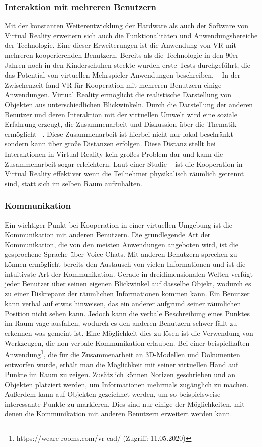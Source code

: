 \subsubsection{Interaktion mit mehreren Benutzern}
Mit der konstanten Weiterentwicklung der Hardware als auch der Software von Virtual Reality erweitern sich auch die Funktionalitäten und Anwendungsbereiche der Technologie. Eine dieser Erweiterungen ist die Anwendung von VR mit mehreren kooperierenden Benutzern. Bereits als die Technologie in den 90er Jahren noch in den Kinderschuhen steckte wurden erste Tests durchgeführt, die das Potential von virtuellen Mehrspieler-Anwendungen beschreiben. ~\parencite{youngblut1998educational}\newline
In der Zwischenzeit fand VR für Kooperation mit mehreren Benutzern einige Anwendungen. Virtual Reality ermöglicht die realistische Darstellung von Objekten aus unterschiedlichen Blickwinkeln. Durch die Darstellung der anderen Benutzer und deren Interaktion mit der virtuellen Umwelt wird eine soziale Erfahrung erzeugt, die Zusammenarbeit und Diskussion über die Thematik ermöglicht ~\parencite{8798289}. Diese Zusammenarbeit ist hierbei nicht nur lokal beschränkt sondern kann über große Distanzen erfolgen. Diese Distanz stellt bei Interaktionen in Virtual Reality kein großes Problem dar und kann die Zusammenarbeit sogar erleichtern. Laut einer Studie ~\parencite{8848001} ist die Kooperation in Virtual Reality effektiver wenn die Teilnehmer physikalisch räumlich getrennt sind, statt sich im selben Raum aufzuhalten. 

\subsubsection{Kommunikation}
Ein wichtiger Punkt bei Kooperation in einer virtuellen Umgebung ist die Kommunikation mit anderen Benutzern. Die grundlegende Art der Kommunikation, die von den meisten Anwendungen angeboten wird, ist die gesprochene Sprache über Voice-Chats. Mit anderen Benutzern sprechen zu können ermöglicht bereits den Austausch von vielen Informationen und ist die intuitivste Art der Kommunikation. Gerade in dreidimensionalen Welten verfügt jeder Benutzer über seinen eigenen Blickwinkel auf dasselbe Objekt, wodurch es zu einer Diskrepanz der räumlichen Informationen kommen kann. Ein Benutzer kann verbal auf etwas hinweisen, das ein anderer aufgrund seiner räumlichen Position nicht sehen kann. Jedoch kann die verbale Beschreibung eines Punktes im Raum vage ausfallen, wodurch es den anderen Benutzern schwer fällt zu erkennen was gemeint ist. Eine Möglichkeit dies zu lösen ist die Verwendung von Werkzeugen, die non-verbale Kommunikation erlauben. Bei einer beispielhaften Anwendung\footnote{https://weare-rooms.com/vr-cad/ (Zugriff: 11.05.2020)}, die für die Zusammenarbeit an 3D-Modellen und Dokumenten entworfen wurde, erhält man die Möglichkeit mit seiner virtuellen Hand auf Punkte im Raum zu zeigen. Zusätzlich können Notizen geschrieben und an Objekten platziert werden, um Informationen mehrmals zugänglich zu machen. Außerdem kann auf Objekten gezeichnet werden, um so beispielsweise interessante Punkte zu markieren. Dies sind nur einige der Möglichkeiten, mit denen die Kommunikation mit anderen Benutzern erweitert werden kann.

